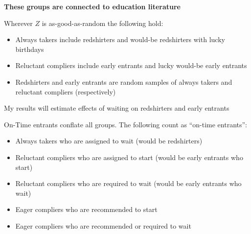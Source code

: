 \documentclass[t,aspectratio=169,11pt,presentation]{beamer}
\newenvironment{wideitemize}{\itemize\addtolength{\itemsep}{14pt}}{\enditemize}
\begin{document}
\begin{frame}[c,label=educ]{\textbf{These groups are connected to education literature}}

\begin{wideitemize}
\item Wherever $Z$ is as-good-as-random the following hold:
\begin{itemize}
    \item Always takers include redshirters and would-be redshirters with lucky birthdays
    \item Reluctant compliers include early entrants and lucky  would-be early entrants 
    \item Redshirters and early entrants are random samples of always takers and reluctant compliers (respectively)
\end{itemize}

\item My results will estimate effects of waiting on redshirters and early entrants

\item On-Time entrants conflate all groups. The following count as ``on-time entrants'':
\begin{itemize}
    \item Always takers who are assigned to wait (would be redshirters) 
    \item Reluctant compliers who are assigned to start (would be early entrants who start)
    \item Reluctant compliers who are required to wait (would be early entrants who wait)
    \item Eager compliers who are recommended to start
    \item Eager compliers who are recommended or required to wait 
\end{itemize}

\end{wideitemize}

\vfill

\hyperlink{wait1}{}   
\end{frame}
\end{document}
